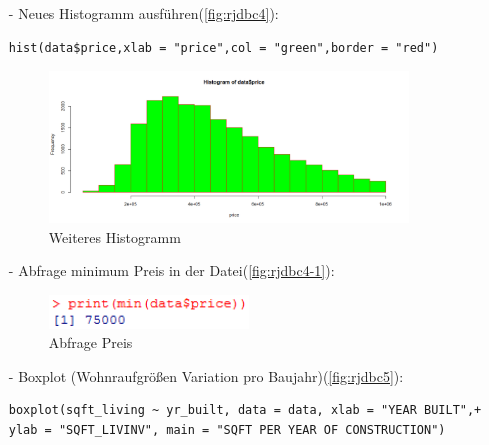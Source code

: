 \begin{itemize}
\item[-]Neues Histogramm ausführen(\autoref{fig:rjdbc4}):
\begin{lstlisting}
hist(data$price,xlab = "price",col = "green",border = "red")
\end{lstlisting}

\begin{figure}[!htb]
        \begin{minipage}{1\textwidth}
                \centering
                \includegraphics[width=0.90\textwidth]{pics/rjdbc4.png}\par\vspace{0cm}
                \caption{Weiteres Histogramm}
                \label{fig:rjdbc4}
        \end{minipage}
\end{figure}

\item[-]Abfrage minimum Preis in der Datei(\autoref{fig:rjdbc4-1}):
\begin{figure}[!htb]
        \begin{minipage}{1\textwidth}
                \centering
                \includegraphics[width=0.50\textwidth]{pics/rjdbc4-1.png}\par\vspace{0cm}
                \caption{Abfrage Preis}
                \label{fig:rjdbc4-1}
        \end{minipage}
\end{figure}

\item[-]Boxplot (Wohnraufgrößen Variation pro Baujahr)(\autoref{fig:rjdbc5}):
\begin{lstlisting}
boxplot(sqft_living ~ yr_built, data = data, xlab = "YEAR BUILT",+    ylab = "SQFT_LIVINV", main = "SQFT PER YEAR OF CONSTRUCTION")
\end{lstlisting}


\end{itemize}
